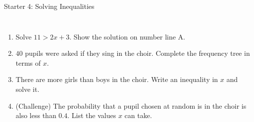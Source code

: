 \documentclass{beamer}
\newcommand{\ashow}[1]{\uncover<2->{\textcolor{red}{\small #1}}}
\newcommand{\tightlist}{%
  \setlength{\itemsep}{0pt}\setlength{\parskip}{0pt}\setlength{\topsep}{0pt}%
}
\begin{document}
\begin{frame}[t]{Starter 4: Solving Inequalities}
\begin{columns}[T,onlytextwidth]
\vspace{-1.5em}
\footnotesize
\begin{enumerate}\tightlist
{}
  \item Solve $11>2x+3$. Show the solution on number line A.
        \ashow{$8>2x$, so $4>x$, which is $x<4$}
  \item $40$ pupils were asked if they sing in the choir. Complete the frequency tree in
        terms of $x$.
  \item There are more girls than boys in the choir. Write an inequality in $x$ and
        solve it.
        \ashow{$x-6>6$, so $x>12$}
  \item (Challenge) The probability that a pupil chosen at random is in the choir is also
        less than $0.4$. List the values $x$ can take.
        \ashow{$0.4\times40=16$, so $12<x<16$: \; $x=13$, $14$ or $15$}
\end{enumerate}
\end{columns}
\end{frame}
\end{document}
